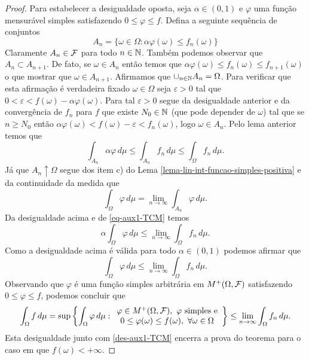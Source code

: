 \begin{proof}
Para estabelecer a desigualdade oposta, seja 
$\alpha\in (0,1)$ e $\varphi$ uma função mensurável
simples satisfazendo $0\leq \varphi\leq f$.
Defina a seguinte sequência de conjuntos 
\[
	A_n = \{\omega\in\Omega: 
			\alpha \varphi(\omega)\leq f_n(\omega)
		\}
\]
Claramente $A_n\in \mathcal{F}$ para todo $n\in\mathbb{N}$. Também 
podemos observar que $A_n\subset A_{n+1}$.
De fato, se $\omega\in A_n$ então 
temos que 
$\alpha \varphi(\omega)\leq f_n(\omega)\leq f_{n+1}(\omega)$
o que mostrar que $\omega\in A_{n+1}$.
Afirmamos que $\cup_{n\in\mathbb{N}} A_n = \Omega$.
Para verificar que esta afirmação é verdadeira 
fixado $\omega\in\Omega$ seja 
$\varepsilon>0$ tal que 
$0<\varepsilon<f(\omega)-\alpha\varphi(\omega)$. 
Para tal $\varepsilon>0$
segue da desigualdade anterior e da convergência de $f_n$
para $f$ que existe $N_0\in\mathbb{N}$
(que pode depender de $\omega$) tal que   
se $n\geq N_0$ então  
$\alpha\varphi(\omega)< f(\omega)-\varepsilon < f_n(\omega)$, 
logo $\omega\in A_n$. Pelo lema anterior temos que 
	\begin{equation}\label{eq-aux1-TCM}
	\int_{A_n} \alpha\varphi\, d\mu
	\leq 
	\int_{A_n} f_n\, d\mu
	\leq
	\int_{\Omega} f_n\, d\mu.
	\end{equation}
Já que $A_n\uparrow \Omega$ segue dos item c) do 
Lema \ref{lema-lin-int-funcao-simples-positiva} e 
da continuidade da medida que 
	\[
		\int_{\Omega} \varphi\, d\mu
		=
		\lim_{n\to\infty} \int_{A_n} \varphi\, d\mu.
	\]
Da desigualdade acima e de \eqref{eq-aux1-TCM} temos 
	\[
		\alpha\int_{\Omega} \varphi\, d\mu
		\leq
		\lim_{n\to\infty} \int_{\Omega} f_n\, d\mu.
	\]
Como a desigualdade acima é válida para todo $\alpha\in(0,1)$
podemos afirmar que 
	\[
		\int_{\Omega} \varphi\, d\mu
		\leq
		\lim_{n\to\infty} \int_{\Omega} f_n\, d\mu.
	\]
Observando que $\varphi$ é uma função simples 
arbitrária em $M^{+}(\Omega,\mathcal{F})$ satisfazendo 
$0\leq \varphi\leq f$, podemos concluir que
\[
		\int_{\Omega} f\, d\mu
		=
		\sup\left\{ 
		\int_{\Omega} \varphi \, d\mu
		:
		\begin{array}{c}
		\varphi \in M^{+}(\Omega,\F),\ 
		\varphi\ \text{simples}\ \text{e}
		\\
		0\leq\varphi(\omega)\leq f(\omega)
		,\ \forall \omega\in\Omega 
		\end{array}
		\right\}
		\leq
		\lim_{n\to\infty} \int_{\Omega} f_n\, d\mu.
\]
Esta desigualdade junto com \eqref{des-aux1-TCM}
encerra a prova do teorema para o caso em 
que $f(\omega)<+\infty$.


\end{proof}
